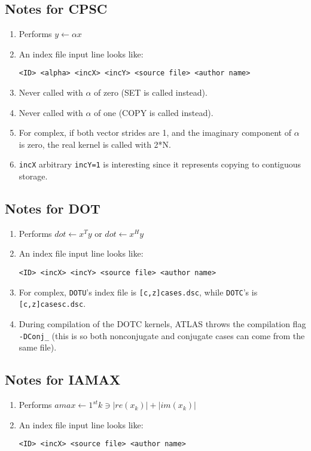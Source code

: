 \documentclass[11pt]{article}
\begin{document}
\subsection{Notes for CPSC}
\begin{enumerate}
\item Performs $ y \leftarrow \alpha x $
\item An index file input line looks like:
\begin{verbatim}
<ID> <alpha> <incX> <incY> <source file> <author name>
\end{verbatim}
\item Never called with $\alpha$ of zero (SET is called instead).
\item Never called with $\alpha$ of one  (COPY is called instead).
\item For complex, if  both vector strides are 1, and the imaginary component of
      $\alpha$ is zero, the real kernel is called with {2*N}.
\item {\tt incX} arbitrary {\tt incY=1} is interesting since it represents
      copying to contiguous storage.
\end{enumerate}

\subsection{Notes for DOT}
\begin{enumerate}
\item Performs $dot \leftarrow x ^ {T} y $ or $ dot \leftarrow x ^ {H} y $
\item
An index file input line looks like:
\begin{verbatim}
<ID> <incX> <incY> <source file> <author name>
\end{verbatim}

\item
For complex, {\tt DOTU}'s index file is {\tt [c,z]cases.dsc}, while
{\tt DOTC}'s is {\tt [c,z]casesc.dsc}.  

\item
During compilation of the {DOTC} kernels, ATLAS throws the compilation
flag {\tt -DConj\_} (this is so both nonconjugate and conjugate cases
can come from the same file).

\end{enumerate}

\subsection{Notes for IAMAX}
\begin{enumerate}
\item Performs 
      $ amax \leftarrow 1^{st} k \ni | re( x _ {k} ) |  + | im( x _ {k} ) | $
\item
An index file input line looks like:
\begin{verbatim}
<ID> <incX> <source file> <author name>
\end{verbatim}
\end{enumerate}
\end{document}
